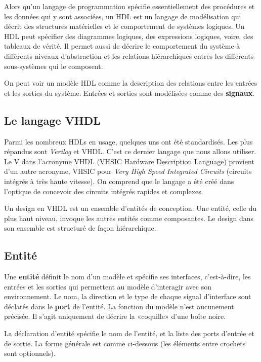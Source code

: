 \documentclass[11pt]{article}
\begin{document}
Alors qu'un langage de programmation spécifie essentiellement des
procédures et les données qui y sont associées, un HDL est un langage
de modélisation qui décrit des structures matérielles et le
comportement de systèmes logiques. Un HDL peut spécifier des
diagrammes logiques, des expressions logiques, voire, des tableaux de
vérité. Il permet aussi de décrire le comportement du système à
différents niveaux d'abstraction et les relations hiérarchiques entres
les différents sous-systèmes qui le composent.

On peut voir un modèle HDL comme la description des relations entre
les entrées et les sorties du système. Entrées et sorties sont
modélisées comme des \textbf{signaux}.

\subsection{Le langage VHDL}
\label{sec:org9b4476f}

Parmi les nombreux HDLs en usage, quelques uns ont été
standardisés. Les plus répandus sont \emph{Verilog} et VHDL. C'est ce
dernier langage que nous allons utiliser.  Le V dans l'acronyme VHDL
(VHSIC Hardware Description Language) provient d'un autre acronyme,
VHSIC pour \emph{Very High Speed Integrated Circuits} (circuits intégrés à
très haute vitesse). On comprend que le langage a été créé dans
l'optique de concevoir des circuits intégrés rapides et complexes.

Un design en VHDL est un ensemble d'entités de conception. Une entité,
celle du plus haut niveau, invoque les autres entités comme
composantes.  Le design dans son ensemble est structuré de façon
hiérarchique.

\subsection{Entité}
\label{sec:org527e34d}

Une \textbf{entité} définit le nom d'un modèle et spécifie ses interfaces,
c'est-à-dire, les entrées et les sorties qui permettent au modèle
d'interagir avec son environnement. Le nom, la direction et le type
de chaque signal d'interface sont déclarés dans le \textbf{port} de
l'entité. La fonction du modèle n'est aucunement précisée. Il s'agit
uniquement de décrire la «coquille» d'une boîte noire.

La déclaration d'entité spécifie le nom de l'entité, et la liste des
ports d'entrée et de sortie. La forme générale est comme ci-dessous (les
éléments entre crochets sont optionnels). 
\end{document}
